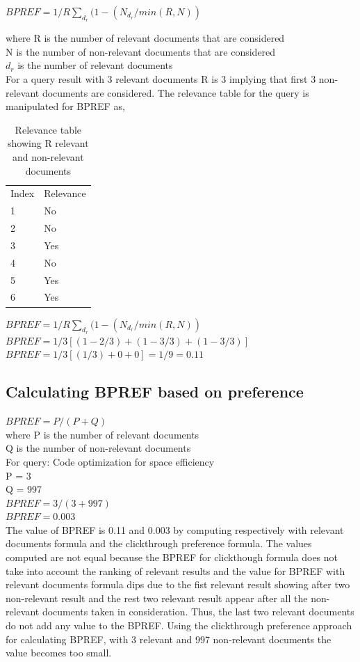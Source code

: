 \documentclass[12pt]{report}
\begin{document}
$BPREF = 1/R \sum\limits_{d_r}^{}(1- ({N_{d_r}} / min(R,N))$

where R is the number of relevant documents that are considered\\
N is the number of non-relevant documents that are considered\\
$d_r$ is the number of relevant documents\\
 
For a query result with 3 relevant documents R is 3 implying that first 3 non-relevant documents are considered. The relevance table for the query is manipulated for BPREF as,\\

\begin{table}[]
\centering
\caption{Relevance table showing R relevant and non-relevant documents}
\label{my-label}
\begin{tabular}{ll}
Index & Relevance \\
1     & No       \\
2     & No        \\
3     & Yes        \\
4     & No       \\
5     & Yes        \\
6     & Yes      

\end{tabular}
\end{table}
$BPREF = 1/R \sum\limits_{d_r}^{}(1- ({N_{d_r}} / min(R,N))$\\
$BPREF = 1/3[(1-2/3) + (1 - 3/3) + (1- 3/3)]$\\
$BPREF = 1/3 [(1/3) + 0 + 0] = 1/9 = 0.11$

\subsection{Calculating BPREF based on preference}

$BPREF = P /( P + Q)$\\
where P is the number of relevant documents \\
          Q is the number of non-relevant documents\\
For query: Code optimization for space efficiency\\
P = 3\\
Q = 997\\
$BPREF = 3/(3+997)$\\
$BPREF = 0.003$\\

The value of BPREF is 0.11 and 0.003 by computing respectively with relevant documents formula and the clickthrough preference formula. The values computed are not equal because the BPREF for clickthough formula does not take into account the ranking of relevant results and the value for BPREF with relevant documents formula dips due to the fist relevant result showing after two non-relevant result and the rest two relevant result appear after all the non-relevant documents taken in consideration. Thus, the last two relevant documents do not add any value to the BPREF. Using the clickthrough preference approach for calculating BPREF, with 3 relevant and 997 non-relevant documents the value becomes too small.
 
\end{document}
